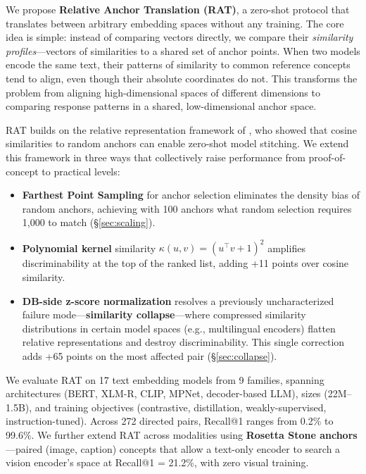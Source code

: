 \documentclass{article}
\begin{document}
We propose \textbf{Relative Anchor Translation (RAT)}, a zero-shot protocol that translates between arbitrary embedding spaces without any training. The core idea is simple: instead of comparing vectors directly, we compare their \emph{similarity profiles}---vectors of similarities to a shared set of anchor points. When two models encode the same text, their patterns of similarity to common reference concepts tend to align, even though their absolute coordinates do not. This transforms the problem from aligning high-dimensional spaces of different dimensions to comparing response patterns in a shared, low-dimensional anchor space.

RAT builds on the relative representation framework of \citet{moschella2023relative}, who showed that cosine similarities to random anchors can enable zero-shot model stitching. We extend this framework in three ways that collectively raise performance from proof-of-concept to practical levels:
\begin{itemize}
  \item \textbf{Farthest Point Sampling} for anchor selection eliminates the density bias of random anchors, achieving with 100 anchors what random selection requires 1,000 to match (\S\ref{sec:scaling}).
  \item \textbf{Polynomial kernel} similarity $\kappa(u,v) = (u^\top v + 1)^2$ amplifies discriminability at the top of the ranked list, adding +11 points over cosine similarity.
  \item \textbf{DB-side z-score normalization} resolves a previously uncharacterized failure mode---\textbf{similarity collapse}---where compressed similarity distributions in certain model spaces (e.g., multilingual encoders) flatten relative representations and destroy discriminability. This single correction adds +65 points on the most affected pair (\S\ref{sec:collapse}).
\end{itemize}

We evaluate RAT on 17 text embedding models from 9 families, spanning architectures (BERT, XLM-R, CLIP, MPNet, decoder-based LLM), sizes (22M--1.5B), and training objectives (contrastive, distillation, weakly-supervised, instruction-tuned). Across 272 directed pairs, Recall@1 ranges from 0.2\% to 99.6\%. We further extend RAT across modalities using \textbf{Rosetta Stone anchors}---paired (image, caption) concepts that allow a text-only encoder to search a vision encoder's space at Recall@1 = 21.2\%, with zero visual training.
\end{document}
